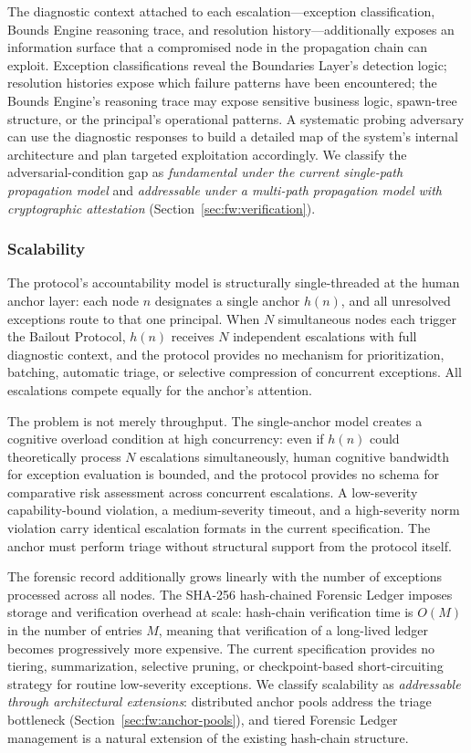 The diagnostic context attached to each escalation---exception classification, Bounds Engine reasoning trace, and resolution history---additionally exposes an information surface that a compromised node in the propagation chain can exploit. Exception classifications reveal the Boundaries Layer's detection logic; resolution histories expose which failure patterns have been encountered; the Bounds Engine's reasoning trace may expose sensitive business logic, spawn-tree structure, or the principal's operational patterns. A systematic probing adversary can use the diagnostic responses to build a detailed map of the system's internal architecture and plan targeted exploitation accordingly. We classify the adversarial-condition gap as \emph{fundamental under the current single-path propagation model} and \emph{addressable under a multi-path propagation model with cryptographic attestation} (Section~\ref{sec:fw:verification}).

\subsubsection{Scalability}
\label{sec:lim:scalability}

The protocol's accountability model is structurally single-threaded at the human anchor layer: each node $n$ designates a single anchor $h(n)$, and all unresolved exceptions route to that one principal. When $N$ simultaneous nodes each trigger the Bailout Protocol, $h(n)$ receives $N$ independent escalations with full diagnostic context, and the protocol provides no mechanism for prioritization, batching, automatic triage, or selective compression of concurrent exceptions. All escalations compete equally for the anchor's attention.

The problem is not merely throughput. The single-anchor model creates a cognitive overload condition at high concurrency: even if $h(n)$ could theoretically process $N$ escalations simultaneously, human cognitive bandwidth for exception evaluation is bounded, and the protocol provides no schema for comparative risk assessment across concurrent escalations. A low-severity capability-bound violation, a medium-severity timeout, and a high-severity norm violation carry identical escalation formats in the current specification. The anchor must perform triage without structural support from the protocol itself.

The forensic record additionally grows linearly with the number of exceptions processed across all nodes. The SHA-256 hash-chained Forensic Ledger imposes storage and verification overhead at scale: hash-chain verification time is $O(M)$ in the number of entries $M$, meaning that verification of a long-lived ledger becomes progressively more expensive. The current specification provides no tiering, summarization, selective pruning, or checkpoint-based short-circuiting strategy for routine low-severity exceptions. We classify scalability as \emph{addressable through architectural extensions}: distributed anchor pools address the triage bottleneck (Section~\ref{sec:fw:anchor-pools}), and tiered Forensic Ledger management is a natural extension of the existing hash-chain structure.

